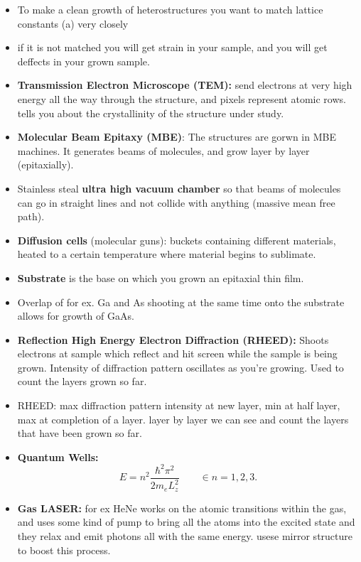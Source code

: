 \begin{itemize}
    \item To make a clean growth of heterostructures you want to match lattice constants (a) very closely
    \item if it is not matched you will get strain in your sample, and you will get deffects in your grown sample.
    
    \item \textbf{Transmission Electron Microscope (TEM):} send electrons at very high energy all the way through the structure, and pixels represent atomic rows. tells you about the crystallinity of the structure under study.
    
    \item \textbf{Molecular Beam Epitaxy (MBE)}: The structures are gorwn in MBE machines. It generates beams of molecules, and grow layer by layer (epitaxially). 
    \item Stainless steal \textbf{ultra high vacuum chamber} so that beams of molecules can go in straight lines and not collide with anything (massive mean free path).
    \item \textbf{Diffusion cells} (molecular guns): buckets containing different materials, heated to a certain temperature where material begins to sublimate.
    \item \textbf{Substrate} is the base on which you grown an epitaxial thin film.
    \item Overlap of for ex. Ga and As shooting at the same time onto the substrate allows for growth of GaAs.
    \item \textbf{ Reflection High Energy Electron Diffraction (RHEED):} Shoots electrons at sample which reflect and hit screen while the sample is being grown. Intensity of diffraction pattern oscillates as you're growing. Used to count the layers grown so far.
    \item RHEED: max diffraction pattern intensity at new layer, min at half layer, max at completion of a layer. layer by layer we can see and count the layers that have been grown so far.
    \item \textbf{Quantum Wells:} \begin{equation}
        E = n^2 \frac{\hbar^2 \pi^2}{2m_eL_z^2} \qquad \in n =1,2,3.
    \end{equation} 
    \item \textbf{Gas LASER:} for ex HeNe works on the atomic transitions within the gas, and uses some kind of pump to bring all the atoms into the excited state and they relax and emit photons all with the same energy. usese mirror structure to boost this process.

\end{itemize}
